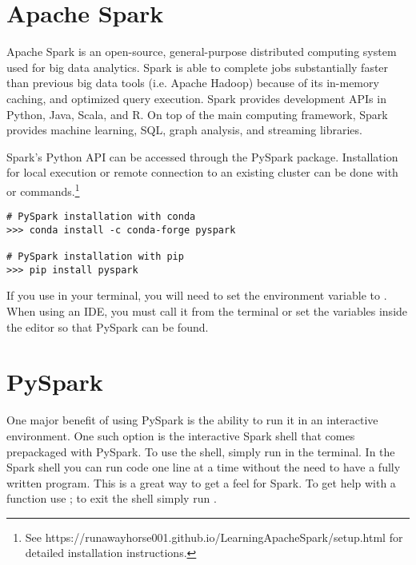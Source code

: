 

\section*{Apache Spark} %
Apache Spark is an open-source, general-purpose distributed computing system used for big data analytics.
Spark is able to complete jobs substantially faster than previous big data tools (i.e. Apache Hadoop) because of its in-memory caching, and optimized query execution.
Spark provides development APIs in Python, Java, Scala, and R.
On top of the main computing framework, Spark provides machine learning, SQL, graph analysis, and streaming libraries.

Spark's Python API can be accessed through the PySpark package. 
Installation for local execution or remote connection to an existing cluster can be done with  or  commands.\footnote{See https://runawayhorse001.github.io/LearningApacheSpark/setup.html for detailed installation instructions.}

\begin{lstlisting}
# PySpark installation with conda
>>> conda install -c conda-forge pyspark

# PySpark installation with pip
>>> pip install pyspark
\end{lstlisting}


If you use  in your terminal, you will need to set the  environment variable to .
When using an IDE, you must call it from the terminal or set the variables inside the editor so that PySpark can be found.


\section*{PySpark} %
One major benefit of using PySpark is the ability to run it in an interactive environment. 
One such option is the interactive Spark shell that comes prepackaged with PySpark. 
To use the shell, simply run  in the terminal. 
In the Spark shell you can run code one line at a time without the need to have a fully written program. This is a great way to get a feel for Spark. 
To get help with a function use ; to exit the shell simply run .

